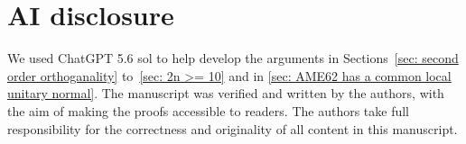 \section*{AI disclosure}


We used ChatGPT 5.6 sol to help develop the arguments in Sections~\ref{sec: second order orthoganality} to~\ref{sec: 2n >= 10} and in \autoref{sec: AME62 has a common local unitary normal}.
The manuscript was verified and written by the authors, with the aim of making the proofs accessible to readers.
The authors take full responsibility for the correctness and originality of all content in this manuscript.
